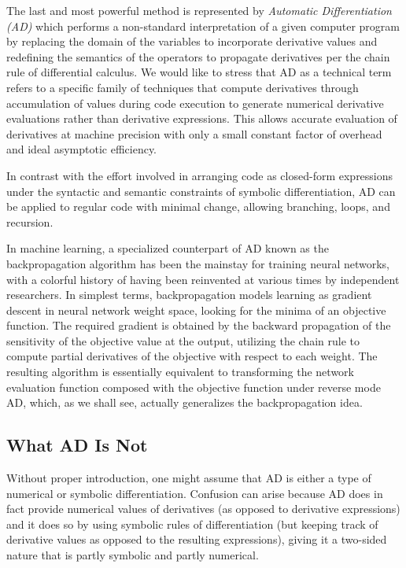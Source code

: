 The last and most powerful method is represented by \emph{Automatic Differentiation (AD)} which performs a non-standard interpretation of a given computer program by replacing the domain of the variables to incorporate derivative values and redefining the semantics of the operators to propagate derivatives per the chain rule of differential calculus. We would like to stress that AD as a technical term refers to a specific family of techniques that compute derivatives through accumulation of values during code execution to generate numerical derivative evaluations rather than derivative expressions. This allows accurate evaluation of derivatives at machine precision with only a small constant factor of overhead and ideal asymptotic efficiency.

In contrast with the effort involved in arranging code as closed-form expressions under the syntactic and semantic constraints of symbolic differentiation, AD can be applied to regular code with minimal change, allowing branching, loops, and recursion. 
\newline 

In machine learning, a specialized counterpart of AD known as the backpropagation algorithm has been the mainstay for training neural networks, with a colorful history of having been reinvented at various times by independent researchers. In simplest terms, backpropagation models learning as gradient descent in neural network weight space, looking for the minima of an objective function. The required gradient is obtained by the backward propagation of the sensitivity of the objective value at the output, utilizing the chain rule to compute partial derivatives of the objective with respect to each weight. The resulting algorithm is essentially equivalent to transforming the network evaluation function composed with the objective function under reverse mode AD, which, as we shall see, actually generalizes the backpropagation idea.

\subsection{What AD Is Not}
Without proper introduction, one might assume that AD is either a type of numerical or symbolic differentiation. Confusion can arise because AD does in fact provide numerical values of derivatives (as opposed to derivative expressions) and it does so by using symbolic rules of differentiation (but keeping track of derivative values as opposed to the resulting expressions), giving it a two-sided nature that is partly symbolic and partly numerical.

